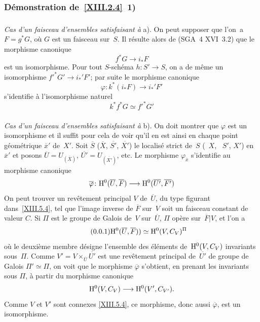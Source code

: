 \subsubsection*{D\'emonstration de~\ref{XIII.2.4}~\textup{1)}}
\subsubsection{}
\label{XIII.2.4.1}
\emph{Cas d'un faisceau d'ensembles satisfaisant à} a). On peut
supposer que l'on~a $F=g^*G$, o\`u $G$ est un faisceau sur~$S$. Il
r\'esulte alors de (SGA~4 XVI~3.2) que le morphisme canonique
\begin{equation*}
\label{eq:XIII.2.4.1.1}
\tag{\thesubsubsection.1} f^*G\to i_*F
\end{equation*}
est un isomorphisme. Pour tout $S$-sch\'ema $h\colon S'\to S$, on a
de m\^eme un isomorphisme $f'^*G'\to i_*'F'$; par suite le morphisme
canonique
$$
\varphi\colon k^*(i_*F)\to i_*'F'
$$
s'identifie \`a l'isomorphisme naturel
$$
k^*f^*G\simeq f'^*G'
$$

\subsubsection{}
\label{XIII.2.4.2}
\emph{Cas d'un faisceau d'ensembles satisfaisant à} b). On doit
montrer que $\varphi$ est un isomorphisme et il suffit pour cela de
voir qu'il en est ainsi en chaque point g\'eom\'etrique
$\overline{x}'$ de~$X'$. Soit $\overline{S}$ (\resp $\overline{X}$,
\resp $\overline{S'}$, \resp $\overline{X'}$) le localis\'e strict
de~$S$ (\resp~$X$, \resp~$S'$, \resp $X'$) en $\overline{x}'$ et posons
$\overline{U}=U_{(\overline{X})}$,
$\overline{U'}=U_{(\overline{X'})}$, etc. Le morphisme
$\varphi_{\overline{x}}$ s'identifie au morphisme canonique
$$
\overline{\varphi}\colon \H^0(\overline{U},\overline{F})\to
\H^0(\overline{U'}, \overline{F'})
$$
On peut trouver un rev\^etement principal $V$ de~$\overline{U}$, du
type figurant dans~\ref{XIII.5.4}, tel que l'image inverse de
$\overline{F}$ sur~$V$ soit un faisceau constant de valeur $C$. Si
$\Pi$ est le groupe de Galois de~$V$ sur~$\overline{U}$, $\Pi$
op\`ere sur~$\overline{F}|V$, et l'on a
\begin{equation*}
\label{eq:XIII.2.4.2.1}
\tag{\thesubsubsection.1}
\H^0(\overline{U},\overline{F}))\simeq \H^0(V,C_V)^{\Pi}
\end{equation*}
\label{indnot:mh}o\`u le deuxi\`eme membre d\'esigne l'ensemble des
\'el\'ements de~$\mathrm{H}^0(V,C_V)$ invariants
sous~$\Pi$. Comme $V'=V\times_{\overline{U}}\overline{U'}$ est une
rev\^etement principal de~$\overline{U'}$ de groupe de Galois
$\Pi'\simeq \Pi$, on voit que le morphisme $\overline{\varphi}$
s'obtient, en prenant les invariants sous $\Pi$, \`a partir du
morphisme canonique
$$
\H^0(V,C_V)\to \H^0(V',C_{V'}).
$$
Comme $V$ et $V'$ sont connexes \eqref{XIII.5.4}, ce morphisme, donc
aussi $\overline{\varphi}$, est un isomorphisme.

